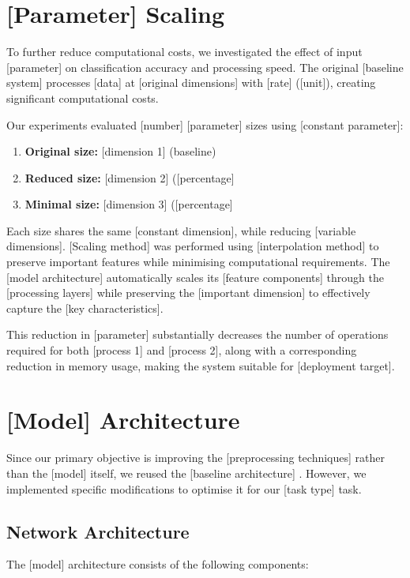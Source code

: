 \section{[Parameter] Scaling}

To further reduce computational costs, we investigated the effect of input [parameter] on classification accuracy and processing speed. The original [baseline system] processes [data] at [original dimensions] with [rate] ([unit]), creating significant computational costs.

Our experiments evaluated [number] [parameter] sizes using [constant parameter]:
\begin{enumerate}
\item \textbf{Original size:} [dimension 1] (baseline)
\item \textbf{Reduced size:} [dimension 2] ([percentage]%
\item \textbf{Minimal size:} [dimension 3] ([percentage]%
\end{enumerate}

Each size shares the same [constant dimension], while reducing [variable dimensions]. [Scaling method] was performed using [interpolation method] to preserve important features while minimising computational requirements. The [model architecture] automatically scales its [feature components] through the [processing layers] while preserving the [important dimension] to effectively capture the [key characteristics].

This reduction in [parameter] substantially decreases the number of operations required for both [process 1] and [process 2], along with a corresponding reduction in memory usage, making the system suitable for [deployment target].

\section{[Model] Architecture}

Since our primary objective is improving the [preprocessing techniques] rather than the [model] itself, we reused the [baseline architecture] \cite{haynes2016crc}. However, we implemented specific modifications to optimise it for our [task type] task.

\subsection{Network Architecture}

The [model] architecture consists of the following components:

